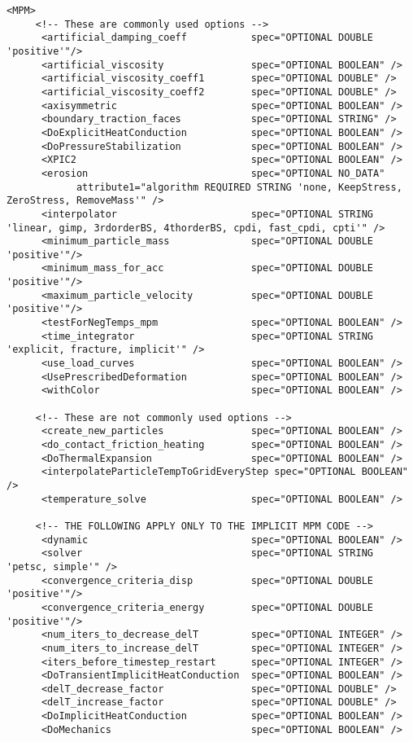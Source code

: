 \begin{Verbatim}[fontsize=\footnotesize]
    <MPM>
     <!-- These are commonly used options -->
      <artificial_damping_coeff           spec="OPTIONAL DOUBLE 'positive'"/>
      <artificial_viscosity               spec="OPTIONAL BOOLEAN" />
      <artificial_viscosity_coeff1        spec="OPTIONAL DOUBLE" />
      <artificial_viscosity_coeff2        spec="OPTIONAL DOUBLE" />
      <axisymmetric                       spec="OPTIONAL BOOLEAN" />
      <boundary_traction_faces            spec="OPTIONAL STRING" />
      <DoExplicitHeatConduction           spec="OPTIONAL BOOLEAN" />
      <DoPressureStabilization            spec="OPTIONAL BOOLEAN" />
      <XPIC2                              spec="OPTIONAL BOOLEAN" />
      <erosion                            spec="OPTIONAL NO_DATA"
            attribute1="algorithm REQUIRED STRING 'none, KeepStress, ZeroStress, RemoveMass'" />
      <interpolator                       spec="OPTIONAL STRING 'linear, gimp, 3rdorderBS, 4thorderBS, cpdi, fast_cpdi, cpti'" />
      <minimum_particle_mass              spec="OPTIONAL DOUBLE 'positive'"/>
      <minimum_mass_for_acc               spec="OPTIONAL DOUBLE 'positive'"/>
      <maximum_particle_velocity          spec="OPTIONAL DOUBLE 'positive'"/>
      <testForNegTemps_mpm                spec="OPTIONAL BOOLEAN" />
      <time_integrator                    spec="OPTIONAL STRING 'explicit, fracture, implicit'" />
      <use_load_curves                    spec="OPTIONAL BOOLEAN" />
      <UsePrescribedDeformation           spec="OPTIONAL BOOLEAN" />
      <withColor                          spec="OPTIONAL BOOLEAN" />

     <!-- These are not commonly used options -->
      <create_new_particles               spec="OPTIONAL BOOLEAN" />
      <do_contact_friction_heating        spec="OPTIONAL BOOLEAN" />
      <DoThermalExpansion                 spec="OPTIONAL BOOLEAN" />
      <interpolateParticleTempToGridEveryStep spec="OPTIONAL BOOLEAN" />
      <temperature_solve                  spec="OPTIONAL BOOLEAN" />

     <!-- THE FOLLOWING APPLY ONLY TO THE IMPLICIT MPM CODE -->
      <dynamic                            spec="OPTIONAL BOOLEAN" />
      <solver                             spec="OPTIONAL STRING 'petsc, simple'" />
      <convergence_criteria_disp          spec="OPTIONAL DOUBLE 'positive'"/>
      <convergence_criteria_energy        spec="OPTIONAL DOUBLE 'positive'"/>
      <num_iters_to_decrease_delT         spec="OPTIONAL INTEGER" />
      <num_iters_to_increase_delT         spec="OPTIONAL INTEGER" />
      <iters_before_timestep_restart      spec="OPTIONAL INTEGER" />
      <DoTransientImplicitHeatConduction  spec="OPTIONAL BOOLEAN" />
      <delT_decrease_factor               spec="OPTIONAL DOUBLE" />
      <delT_increase_factor               spec="OPTIONAL DOUBLE" />
      <DoImplicitHeatConduction           spec="OPTIONAL BOOLEAN" />
      <DoMechanics                        spec="OPTIONAL BOOLEAN" />


\end{Verbatim}
